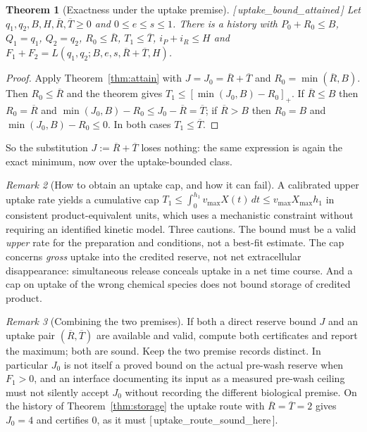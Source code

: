 \documentclass[11pt]{article}
\theoremstyle{plain}
\newtheorem{theorem}{Theorem}[section]
\theoremstyle{definition}
\theoremstyle{remark}
\newtheorem{remark}[theorem]{Remark}
\newcommand{\pos}[1]{\left[#1\right]_{+}}
\newcommand{\leanref}[1]{{\normalfont\sffamily\footnotesize[\,#1\,]}}
\newcommand{\Lc}{L}
\begin{document}
\begin{theorem}[Exactness under the uptake premise]\label{thm:uptakeattain}
\leanref{uptake\_bound\_attained}
Let $q_1,q_2,B,H,\overline R,\overline T\ge0$ and $0\le e\le s\le1$. There is
a history with $P_0+R_0\le B$, $Q_1=q_1$, $Q_2=q_2$, $R_0\le\overline R$,
$T_1\le\overline T$, $i_P+i_R\le H$ and
$F_1+F_2=\Lc(q_1,q_2;B,e,s,\overline R+\overline T,H)$.
\end{theorem}

\begin{proof}
Apply Theorem~\ref{thm:attain} with $J=J_0=\overline R+\overline T$ and
$R_0=\min(\overline R,B)$. Then $R_0\le\overline R$ and the theorem gives
$T_1\le\pos{\min(J_0,B)-R_0}$. If $\overline R\le B$ then $R_0=\overline R$
and $\min(J_0,B)-R_0\le J_0-\overline R=\overline T$; if $\overline R>B$ then
$R_0=B$ and $\min(J_0,B)-R_0\le0$. In both cases $T_1\le\overline T$.
\end{proof}

So the substitution $J:=\overline R+\overline T$ loses nothing: the same
expression is again the exact minimum, now over the uptake-bounded class.

\begin{remark}[How to obtain an uptake cap, and how it can fail]
A calibrated upper uptake rate yields a cumulative cap
$T_1\le\int_0^{h_1}v_{\max}X(t)\,dt\le v_{\max}X_{\max}h_1$ in consistent
product-equivalent units, which uses a mechanistic constraint without
requiring an identified kinetic model. Three cautions. The bound must be a
valid \emph{upper} rate for the preparation and conditions, not a best-fit
estimate. The cap concerns \emph{gross} uptake into the credited reserve, not
net extracellular disappearance: simultaneous release conceals uptake in a net
time course. And a cap on uptake of the wrong chemical species does not bound
storage of credited product.
\end{remark}

\begin{remark}[Combining the two premises]
If both a direct reserve bound $J$ and an uptake pair
$(\overline R,\overline T)$ are available and valid, compute both certificates
and report the maximum; both are sound. Keep the two premise records distinct.
In particular $J_0$ is not itself a proved bound on the actual pre-wash
reserve when $F_1>0$, and an interface documenting its input as a measured
pre-wash ceiling must not silently accept $J_0$ without recording the
different biological premise. On the history of Theorem~\ref{thm:storage} the
uptake route with $\overline R=\overline T=2$ gives $J_0=4$ and certifies
$0$, as it must \leanref{uptake\_route\_sound\_here}.
\end{remark}
\end{document}
